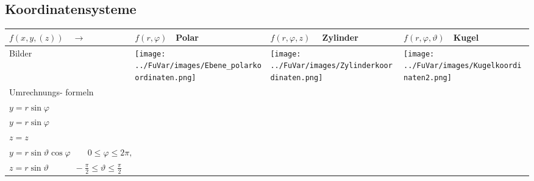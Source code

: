 \subsection{Koordinatensysteme}
\begin{tabular}{|p{2.5cm}||p{3cm}|p{4.2cm}|p{7.5cm}|}
	\hline
	$f(x,y,(z))\quad\rightarrow$ &
	\begin{minipage}{2.4cm}
    	\vspace{0.1cm}
		$f(r,\varphi)\quad$\textbf{Polar} 
    	\vspace{0.1cm}    	
    \end{minipage}& 
	$f(r,\varphi,z)\quad$ \textbf{Zylinder} &
	$f(r,\varphi,\vartheta)\quad$\textbf{Kugel}\\
	\hline
	\hline
	Bilder &
	\begin{minipage}{3cm}
    	\texttt{[image: ../FuVar/images/Ebene\_polarkoordinaten.png]}
    \end{minipage}&
	\begin{minipage}{4.2cm}
    	\texttt{[image: ../FuVar/images/Zylinderkoordinaten.png]}
    \end{minipage}&
	\begin{minipage}{4.2cm}
    	\texttt{[image: ../FuVar/images/Kugelkoordinaten2.png]}
    \end{minipage}\\
	\hline
	Umrechnungs- formeln &
	\begin{minipage}{3cm}
    \vspace{0.1cm}
		$x=r\cos\varphi$\\
		$y=r\sin\varphi$    
    \vspace{0.1cm}
    \end{minipage}&	
	\begin{minipage}{4.2cm}
    \vspace{0.1cm}
    	$x=r\cos\varphi$\\
    	$y=r\sin\varphi$\\
    	$z=z$
    \vspace{0.1cm}
    \end{minipage}&	
	\begin{minipage}{7.5cm}
    \vspace{0.1cm}
    	$x=r\cos\vartheta\cos\varphi \quad\quad r \geq 0,$\\
    	$y=r\sin\vartheta\cos\varphi \quad\quad  0\leq\varphi\leq 2\pi,$\\
    	$z=r\sin\vartheta \quad\quad\quad
    	-\frac{\pi}{2}\leq\vartheta\leq\frac{\pi}{2}$
    \vspace{0.1cm}

\end{minipage}
\end{tabular}
